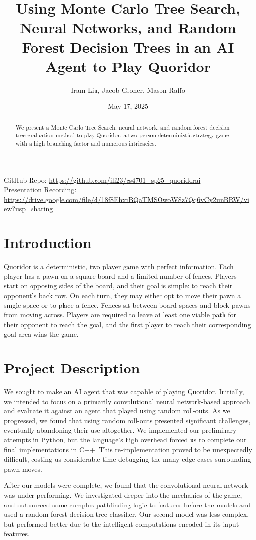 \documentclass[10pt]{article}
\title{\bfseries Using Monte Carlo Tree Search, Neural Networks, and Random Forest Decision Trees in an AI Agent to Play Quoridor}
\author{
    Iram Liu, Jacob Groner, Mason Raffo
}
\date{May 17, 2025}
\newcommand{\githubLink}{\url{https://github.com/ili23/cs4701_sp25_quoridorai}}
\newcommand{\presentationLink}{\url{https://drive.google.com/file/d/18f8EhxrBQaTMSOwoW8z7Qq6vCy2unBRW/view?usp=sharing}}
\begin{document}
\maketitle


\begin{abstract}We present a Monte Carlo Tree Search, neural network, and random forest decision tree evaluation method to play Quoridor, a two person deterministic strategy game with a high branching factor and numerous intricacies.
\end{abstract}
GitHub Repo: \githubLink \\
Presentation Recording: \presentationLink
\section{Introduction}
Quoridor is a deterministic, two player game with perfect information. Each player has a pawn on a square board and a limited number of fences. Players start on opposing sides of the board, and their goal is simple: to reach their opponent's back row. On each turn, they may either opt to move their pawn a single space or to place a fence. Fences sit between board spaces and block pawns from moving across. Players are required to leave at least one viable path for their opponent to reach the goal, and the first player to reach their corresponding goal area wins the game.

\section{Project Description}

We sought to make an AI agent that was capable of playing Quoridor. Initially, we intended to focus on a primarily convolutional neural network-based approach and evaluate it against an agent that played using random roll-outs. As we progressed, we found that using random roll-outs presented significant challenges, eventually abandoning their use altogether. We implemented our preliminary attempts in Python, but the language's high overhead forced us to complete our final implementations in C++. This re-implementation proved to be unexpectedly difficult, costing us considerable time debugging the many edge cases surrounding pawn moves.

After our models were complete, we found that the convolutional neural network was under-performing. We investigated deeper into the mechanics of the game, and outsourced some complex pathfinding logic to features before the models and used a random forest decision tree classifier. Our second model was less complex, but performed better due to the intelligent computations encoded in its input features.
\end{document}

